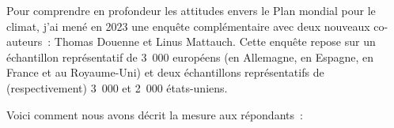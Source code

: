 \documentclass[a5paper,french]{memoir}
\begin{document}

Pour comprendre en profondeur les attitudes envers le Plan mondial pour le climat, j'ai mené en 2023 une enquête complémentaire avec deux nouveaux co-auteurs~: Thomas Douenne et Linus Mattauch. Cette enquête repose sur un échantillon représentatif de 3~000 européens (en Allemagne, en Espagne, en France et au Royaume-Uni) et deux échantillons représentatifs de (respectivement) 3~000 et 2~000 états-uniens. 

Voici comment nous avons décrit la mesure aux répondants~:
\end{document}
